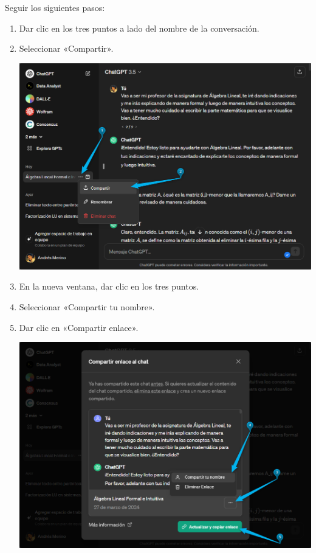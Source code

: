 \documentclass[a4,11pt]{aleph-notas}
\begin{document}
Seguir los siguientes pasos:
\begin{enumerate}
    \item Dar clic en los tres puntos a lado del nombre de la conversación.
    \item Seleccionar «Compartir».
    \begin{center}
        \includegraphics[width=0.85\linewidth]{Figuras/fig01.png}
    \end{center}
    \item En la nueva ventana, dar clic en los tres puntos. 
    \item Seleccionar «Compartir tu nombre».
    \item Dar clic en «Compartir enlace».

    \begin{center}
        \includegraphics[width=0.85\linewidth]{Figuras/fig02.png}
    \end{center}
\end{enumerate}
\end{document}

